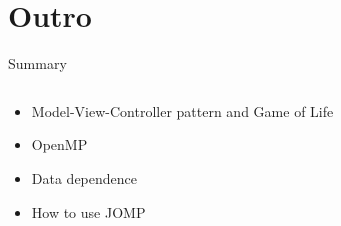 \section*{Outro}

\begin{frame}{Summary}
  \begin{columns}[c]
    \begin{column}{0.55\textwidth}
      \begin{itemize}
      \item Model-View-Controller pattern and Game of Life
      \item OpenMP
      \item Data dependence
      \item How to use JOMP
      \end{itemize}
    \end{column}
    \begin{column}{0.45\textwidth}
      \begin{center}

\end{center}
\end{column}
\end{columns}
\end{frame}
